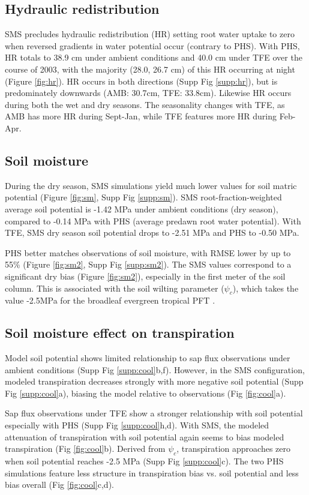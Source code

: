 \documentclass[draft,linenumbers]{agujournal}
\begin{document}
\subsection{Hydraulic redistribution}
    SMS precludes hydraulic redistribution (HR) setting root water uptake to zero when reversed gradients in water potential occur (contrary to PHS).
    With PHS, HR totals to 38.9 cm under ambient conditions and 40.0 cm under TFE over the course of 2003, with the majority (28.0, 26.7 cm) of this HR occurring at night (Figure \ref{fig:hr}).
    HR occurs in both directions (Supp Fig \ref{supp:hr}), but is predominately downwards (AMB: 30.7cm, TFE: 33.8cm).
    Likewise HR occurs during both the wet and dry seasons.
    The seasonality changes with TFE, as AMB has more HR during Sept-Jan, while TFE features more HR during Feb-Apr.

\subsection{Soil moisture}
    During the dry season, SMS simulations yield much lower values for soil matric potential (Figure \ref{fig:sm}, Supp Fig \ref{supp:sm}). 
    SMS root-fraction-weighted average soil potential is -1.42 MPa under ambient conditions (dry season), compared to -0.14 MPa with PHS (average predawn root water potential).
    With TFE, SMS dry season soil potential drops to -2.51 MPa and PHS to -0.50 MPa.

    PHS better matches observations of soil moisture, with RMSE lower by up to 55\% (Figure \ref{fig:sm2}, Supp Fig \ref{supp:sm2}).
    The SMS values correspond to a significant dry bias (Figure \ref{fig:sm2}), especially in the first meter of the soil column.
    This is associated with the soil wilting parameter ($\psi_c$), which takes the value -2.5MPa for the broadleaf evergreen tropical PFT \citep{oleson2013}.
 
\subsection{Soil moisture effect on transpiration}    
    Model soil potential shows limited relationship to sap flux observations under ambient conditions (Supp Fig \ref{supp:cool}b,f).
    However, in the SMS configuration, modeled transpiration decreases strongly with more negative soil potential (Supp Fig \ref{supp:cool}a),
    biasing the model relative to observations (Fig \ref{fig:cool}a).
    
    Sap flux observations under TFE show a stronger relationship with soil potential especially with PHS (Supp Fig \ref{supp:cool}h,d).
    With SMS, the modeled attenuation of transpiration with soil potential again seems to bias modeled transpiration (Fig \ref{fig:cool}b).
    Derived from $\psi_c$, transpiration approaches zero when soil potential reaches -2.5 MPa (Supp Fig \ref{supp:cool}c).
    The two PHS simulations feature less structure in transpiration bias vs. soil potential and less bias overall (Fig \ref{fig:cool}c,d).
    
\end{document}
